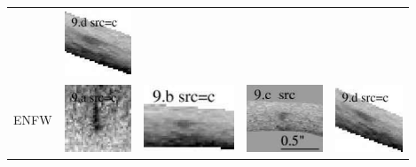 \documentclass[useAMS,usenatbib]{mn2e}
\begin{document}
\begin{table}
\begin{tabular}{ccccc}
    & \multicolumn{1}{m{1.7cm}}{\includegraphics[height=2.00cm,clip]{figs/nsie_img/eA1689_F850LPa.pre_9_d_c_tri.ps}} \\
    \multicolumn{1}{m{1cm}}{{\Large ENFW}}
    & \multicolumn{1}{m{1.7cm}}{\includegraphics[height=2.00cm,clip]{figs/enfw_img/eA1689_F850LPa.pre_9_a_c_tri.ps}}
    & \multicolumn{1}{m{1.7cm}}{\includegraphics[height=2.00cm,clip]{figs/enfw_img/eA1689_F850LPa.pre_9_b_c_tri.ps}}
    & \multicolumn{1}{m{1.7cm}}{\includegraphics[height=2.00cm,clip]{figs/enfw_img/eA1689_F850LPa.src_9_c.ps}}
    & \multicolumn{1}{m{1.7cm}}{\includegraphics[height=2.00cm,clip]{figs/enfw_img/eA1689_F850LPa.pre_9_d_c_tri.ps}} \\
  \end{tabular}

\end{table}

\clearpage
\end{document}
